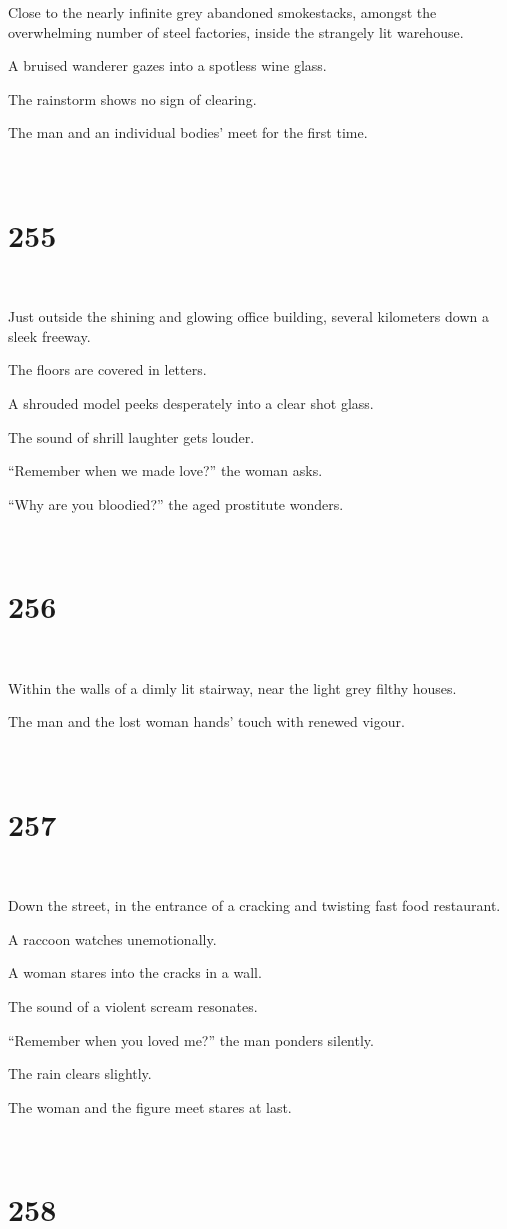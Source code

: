 \documentclass{report}
\begin{document}
Close to the nearly infinite grey abandoned smokestacks, amongst the overwhelming number of steel factories, inside the strangely lit warehouse.

A bruised wanderer gazes into a spotless wine glass.

The rainstorm shows no sign of clearing.

The man and an individual bodies' meet for the first time.

~
\chapter*{255}
~

Just outside the shining and glowing office building, several kilometers down a sleek freeway.

The floors are covered in letters.

A shrouded model peeks desperately into a clear shot glass.

The sound of shrill laughter gets louder.

``Remember when we made love?'' the woman asks.

``Why are you bloodied?'' the aged prostitute wonders.

~
\chapter*{256}
~

Within the walls of a dimly lit stairway, near the light grey filthy houses.

The man and the lost woman hands' touch with renewed vigour.

~
\chapter*{257}
~

Down the street, in the entrance of a cracking and twisting fast food restaurant.

A raccoon watches unemotionally.

A woman stares into the cracks in a wall.

The sound of a violent scream resonates.

``Remember when you loved me?'' the man ponders silently.

The rain clears slightly.

The woman and the figure meet stares at last.

~
\chapter*{258}
~
\end{document}
